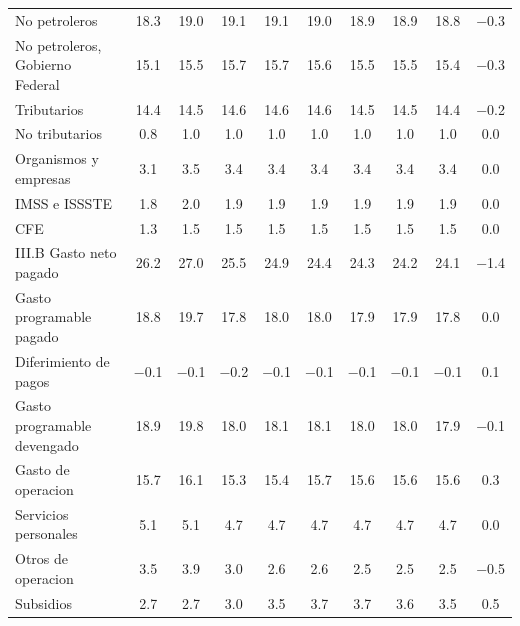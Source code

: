 \begin{longtable}{L{3.7cm}ccccccccc}
{No petroleros} & \num{18.3} & \num{19.0} & \num{19.1} & \num{19.1} & \num{19.0} & \num{18.9} & \num{18.9} & \num{18.8} & \num{-0.3} \\
{No petroleros, Gobierno Federal} & \num{15.1} & \num{15.5} & \num{15.7} & \num{15.7} & \num{15.6} & \num{15.5} & \num{15.5} & \num{15.4} & \num{-0.3} \\
{Tributarios} & \num{14.4} & \num{14.5} & \num{14.6} & \num{14.6} & \num{14.6} & \num{14.5} & \num{14.5} & \num{14.4} & \num{-0.2} \\
{No tributarios} & \num{0.8} & \num{1.0} & \num{1.0} & \num{1.0} & \num{1.0} & \num{1.0} & \num{1.0} & \num{1.0} & \num{0.0} \\
{Organismos y empresas} & \num{3.1} & \num{3.5} & \num{3.4} & \num{3.4} & \num{3.4} & \num{3.4} & \num{3.4} & \num{3.4} & \num{0.0} \\
{IMSS e ISSSTE} & \num{1.8} & \num{2.0} & \num{1.9} & \num{1.9} & \num{1.9} & \num{1.9} & \num{1.9} & \num{1.9} & \num{0.0} \\
{CFE} & \num{1.3} & \num{1.5} & \num{1.5} & \num{1.5} & \num{1.5} & \num{1.5} & \num{1.5} & \num{1.5} & \num{0.0} \\
{III.B Gasto neto pagado} & \num{26.2} & \num{27.0} & \num{25.5} & \num{24.9} & \num{24.4} & \num{24.3} & \num{24.2} & \num{24.1} & \num{-1.4} \\
{Gasto programable pagado} & \num{18.8} & \num{19.7} & \num{17.8} & \num{18.0} & \num{18.0} & \num{17.9} & \num{17.9} & \num{17.8} & \num{0.0} \\
{Diferimiento de pagos} & \num{-0.1} & \num{-0.1} & \num{-0.2} & \num{-0.1} & \num{-0.1} & \num{-0.1} & \num{-0.1} & \num{-0.1} & \num{0.1} \\
{Gasto programable devengado} & \num{18.9} & \num{19.8} & \num{18.0} & \num{18.1} & \num{18.1} & \num{18.0} & \num{18.0} & \num{17.9} & \num{-0.1} \\
{Gasto de operacion} & \num{15.7} & \num{16.1} & \num{15.3} & \num{15.4} & \num{15.7} & \num{15.6} & \num{15.6} & \num{15.6} & \num{0.3} \\
{Servicios personales} & \num{5.1} & \num{5.1} & \num{4.7} & \num{4.7} & \num{4.7} & \num{4.7} & \num{4.7} & \num{4.7} & \num{0.0} \\
{Otros de operacion} & \num{3.5} & \num{3.9} & \num{3.0} & \num{2.6} & \num{2.6} & \num{2.5} & \num{2.5} & \num{2.5} & \num{-0.5} \\
{Subsidios} & \num{2.7} & \num{2.7} & \num{3.0} & \num{3.5} & \num{3.7} & \num{3.7} & \num{3.6} & \num{3.5} & \num{0.5} \\

\end{longtable}
